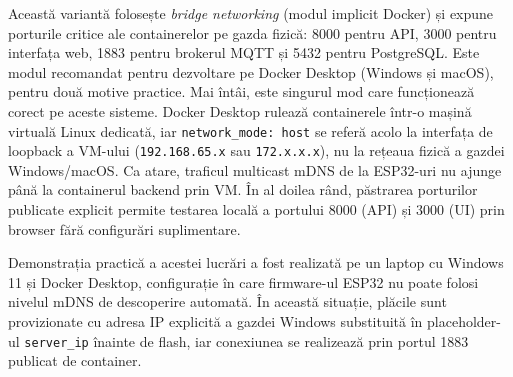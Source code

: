Această variantă folosește \emph{bridge networking} (modul implicit Docker) și expune porturile critice ale containerelor pe gazda fizică: 8000 pentru API, 3000 pentru interfața web, 1883 pentru brokerul MQTT și 5432 pentru PostgreSQL. Este modul recomandat pentru dezvoltare pe Docker Desktop (Windows și macOS), pentru două motive practice. Mai întâi, este singurul mod care funcționează corect pe aceste sisteme. Docker Desktop rulează containerele într-o mașină virtuală Linux dedicată, iar \texttt{network\_mode: host} se referă acolo la interfața de loopback a VM-ului (\texttt{192.168.65.x} sau \texttt{172.x.x.x}), nu la rețeaua fizică a gazdei Windows/macOS. Ca atare, traficul multicast mDNS de la ESP32-uri nu ajunge până la containerul backend prin VM. În al doilea rând, păstrarea porturilor publicate explicit permite testarea locală a portului 8000 (API) și 3000 (UI) prin browser fără configurări suplimentare.

Demonstrația practică a acestei lucrări a fost realizată pe un laptop cu Windows 11 și Docker Desktop, configurație în care firmware-ul ESP32 nu poate folosi nivelul mDNS de descoperire automată. În această situație, plăcile sunt provizionate cu adresa IP explicită a gazdei Windows substituită în placeholder-ul \texttt{server\_ip} înainte de flash, iar conexiunea se realizează prin portul 1883 publicat de container.

